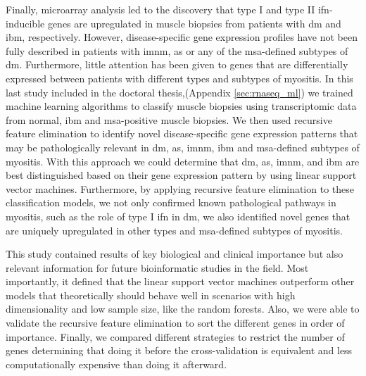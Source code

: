 Finally, microarray analysis led to the discovery that type I and type II \gls{ifn}-inducible genes are upregulated in muscle biopsies from patients with \gls{dm}\cite{Greenberg2005} and \gls{ibm},\cite{Ivanidze2011,Allenbach2014} respectively. However, disease-specific gene expression profiles have not been fully described in patients with \gls{imnm}, \gls{as} or any of the \gls{msa}-defined subtypes of \gls{dm}. Furthermore, little attention has been given to genes that are differentially expressed between patients with different types and subtypes of myositis.\cite{Greenberg2005,Greenberg2002,Hamann2017,Raju2005} In this last study included in the doctoral thesis,(Appendix \autoref{sec:rnaseq_ml}) we trained machine learning algorithms to classify muscle biopsies using transcriptomic data from normal, \gls{ibm} and \gls{msa}-positive muscle biopsies. We then used recursive feature elimination to identify novel disease-specific gene expression patterns that may be pathologically relevant in \gls{dm},  \gls{as}, \gls{imnm}, \gls{ibm} and \gls{msa}-defined subtypes of myositis. With this approach we could determine that \gls{dm},  \gls{as}, \gls{imnm}, and \gls{ibm} are best distinguished based on their gene expression pattern by using linear support vector machines. Furthermore, by applying recursive feature elimination to these classification models, we not only confirmed known pathological pathways in myositis, such as the role of type I \gls{ifn} in \gls{dm}, we also identified novel genes that are uniquely upregulated in other types and \gls{msa}-defined subtypes of myositis.

This study contained results of key biological and clinical importance but also relevant information for future bioinformatic studies in the field. Most importantly, it defined that the linear support vector machines outperform other models that theoretically should behave well in scenarios with high dimensionality and low sample size, like the random forests. Also, we were able to validate the recursive feature elimination to sort the different genes in order of importance. Finally, we compared different strategies to restrict the number of genes determining that doing it before the cross-validation is equivalent and less computationally expensive than doing it afterward.

